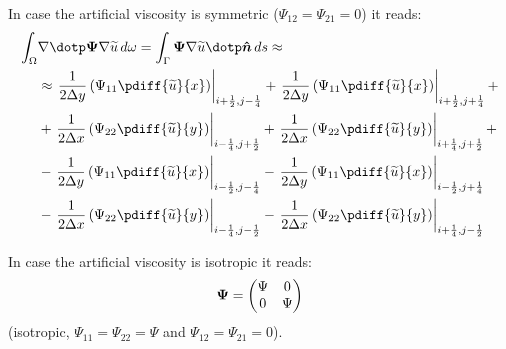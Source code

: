 %
In case the artificial viscosity is symmetric ($\Psi_{12} = \Psi_{21} = 0$) it reads:
%
\begin{align}
    \int_\Omega & \nabla \dotp \bPsi \nabla \widetilde{u}\, d\omega  =
    \int_\Gamma \bPsi \nabla \widetilde{u} \dotp \vec{\hat n}\, ds \approx
    \\
    & \approx
    \left. \frac{1}{2\Dy}\left( \Psi_{11} \pdiff{\widetilde{u}}{x} \right) \right|_{i+\half,j-\quart}
    + \left. \frac{1}{2\Dy} \left( \Psi_{11} \pdiff{\widetilde{u}}{x} \right) \right|_{i+\half,j+\quart} +
    \\
    &
    + \left. \frac{1}{2\Dx} \left( \Psi_{22} \pdiff{\widetilde{u}}{y} \right) \right|_{i-\quart,j+\half}
    + \left. \frac{1}{2\Dx} \left( \Psi_{22} \pdiff{\widetilde{u}}{y} \right) \right|_{i+\quart,j+\half} +
    \\
    &
    -  \left. \frac{1}{2\Dy} \left( \Psi_{11} \pdiff{\widetilde{u}}{x} \right) \right|_{i-\half,j-\quart}
    -  \left. \frac{1}{2\Dy} \left( \Psi_{11} \pdiff{\widetilde{u}}{x} \right) \right|_{i-\half,j+\quart}
    \\
    &
    - \left. \frac{1}{2\Dx} \left( \Psi_{22} \pdiff{\widetilde{u}}{y} \right)  \right|_{i-\quart,j-\half}
    - \left. \frac{1}{2\Dx} \left( \Psi_{22} \pdiff{\widetilde{u}}{y} \right)  \right|_{i+\quart,j-\half}
\end{align}





In case the artificial viscosity is isotropic it reads:
\begin{align}
    \boldsymbol{\Psi} =
    \begin{pmatrix}
        \Psi & 0 \\
        0 & \Psi
    \end{pmatrix}
\end{align}
 (isotropic, $\Psi_{11} = \Psi_{22} = \Psi$ and $\Psi_{12} = \Psi_{21} = 0$).

